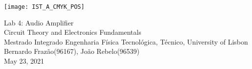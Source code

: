 
\thispagestyle {empty}

\texttt{[image: IST\_A\_CMYK\_POS]}

\begin{center}
%
\vspace{1.0cm}

\vspace{1cm}
{\FontLb Lab 4: Audio Amplifier} \\ %
\vspace{1cm}
{\FontSn Circuit Theory and Electronics Fundamentals} \\
\vspace{1cm}
{\FontSn Mestrado Integrado Engenharia Física Tecnológica, Técnico, University of Lisbon} \\ %
\vspace{1cm}
{\FontSn Bernardo Frazão(96167), João Rebelo(96539)} \\
\vspace{1cm}
{\FontSn May 23, 2021} \\ %
%
\end{center} 
